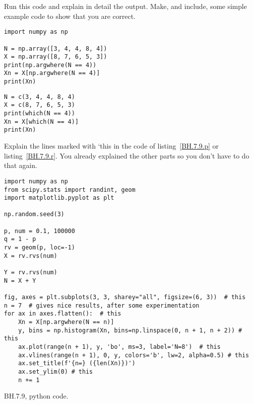 \begin{exercise}
Run this code and explain in detail the output. Make, and include, some simple example code to show that you are correct.

\begin{verbatim}
import numpy as np

N = np.array([3, 4, 4, 8, 4])
X = np.array([8, 7, 6, 5, 3])
print(np.argwhere(N == 4))
Xn = X[np.argwhere(N == 4)]
print(Xn)
\end{verbatim}

\begin{verbatim}
N = c(3, 4, 4, 8, 4)
X = c(8, 7, 6, 5, 3)
print(which(N == 4))
Xn = X[which(N == 4)]
print(Xn)
\end{verbatim}
\end{exercise}

\begin{exercise}
Explain the lines marked with `this in the code of listing~\cref{BH.7.9.p} or listing~\cref{BH.7.9.r}. You already explained the other parts so you don't have to do that again.
\end{exercise}


\begin{listing}[!ht]
\begin{verbatim}
import numpy as np
from scipy.stats import randint, geom
import matplotlib.pyplot as plt

np.random.seed(3)

p, num = 0.1, 100000
q = 1 - p
rv = geom(p, loc=-1)
X = rv.rvs(num)

Y = rv.rvs(num)
N = X + Y

fig, axes = plt.subplots(3, 3, sharey="all", figsize=(6, 3))  # this
n = 7  # gives nice results, after some experimentation
for ax in axes.flatten():  # this
    Xn = X[np.argwhere(N == n)]
    y, bins = np.histogram(Xn, bins=np.linspace(0, n + 1, n + 2)) # this
    ax.plot(range(n + 1), y, 'bo', ms=3, label='N=8')  # this
    ax.vlines(range(n + 1), 0, y, colors='b', lw=2, alpha=0.5) # this
    ax.set_title(f'{n=} ({len(Xn)})')
    ax.set_ylim(0) # this
    n += 1
\end{verbatim}
\caption{BH.7.9, python code.}
\label{BH.7.9.p}
\end{listing}


